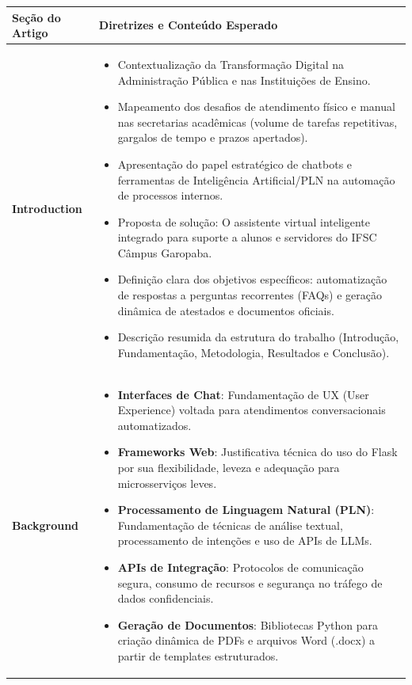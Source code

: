 \documentclass[12pt,a4paper]{article}
\begin{document}
\renewcommand{\arraystretch}{1.4}
\begin{longtable}{|>{\columncolor{white}\RaggedRight}m{4.0cm}|m{13.0cm}|}
\hline
    \rowcolor{azulIFSC}
    \textbf{\color{white}Seção do Artigo} & \textbf{\color{white}Diretrizes e Conteúdo Esperado} \\
\hline
    \textbf{Introduction} & 
    \begin{itemize}[leftmargin=*,noitemsep,topsep=0pt]
        \item Contextualização da Transformação Digital na Administração Pública e nas Instituições de Ensino.
        \item Mapeamento dos desafios de atendimento físico e manual nas secretarias acadêmicas (volume de tarefas repetitivas, gargalos de tempo e prazos apertados).
        \item Apresentação do papel estratégico de chatbots e ferramentas de Inteligência Artificial/PLN na automação de processos internos.
        \item Proposta de solução: O assistente virtual inteligente integrado para suporte a alunos e servidores do IFSC Câmpus Garopaba.
        \item Definição clara dos objetivos específicos: automatização de respostas a perguntas recorrentes (FAQs) e geração dinâmica de atestados e documentos oficiais.
        \item Descrição resumida da estrutura do trabalho (Introdução, Fundamentação, Metodologia, Resultados e Conclusão).
    \end{itemize} \\ \hline
    \textbf{Background} & 
    \begin{itemize}[leftmargin=*,noitemsep,topsep=0pt]
        \item \textbf{Interfaces de Chat}: Fundamentação de UX (User Experience) voltada para atendimentos conversacionais automatizados.
        \item \textbf{Frameworks Web}: Justificativa técnica do uso do Flask por sua flexibilidade, leveza e adequação para microsserviços leves.
        \item \textbf{Processamento de Linguagem Natural (PLN)}: Fundamentação de técnicas de análise textual, processamento de intenções e uso de APIs de LLMs.
        \item \textbf{APIs de Integração}: Protocolos de comunicação segura, consumo de recursos e segurança no tráfego de dados confidenciais.
        \item \textbf{Geração de Documentos}: Bibliotecas Python para criação dinâmica de PDFs e arquivos Word (.docx) a partir de templates estruturados.

\end{itemize}
\end{longtable}
\end{document}
